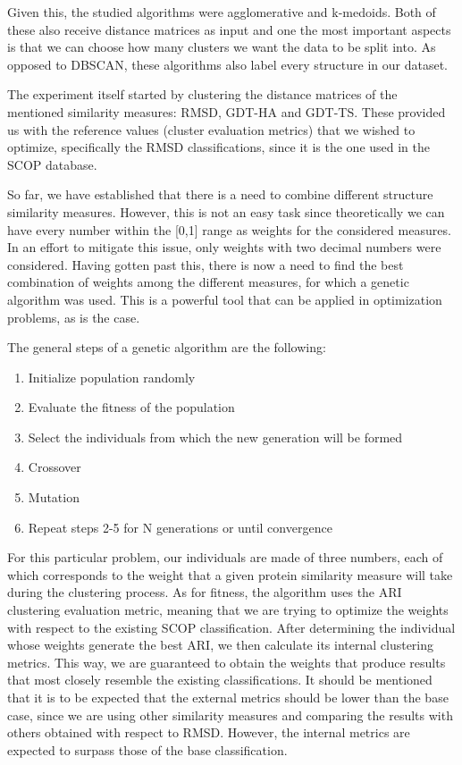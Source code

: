 Given this, the studied algorithms were agglomerative and k-medoids. Both of these also receive distance matrices as input and one the most important aspects is that we can choose how many clusters we want the data to be split into. As opposed to DBSCAN, these algorithms also label every structure in our dataset.

The experiment itself started by clustering the distance matrices of the mentioned similarity measures: RMSD, GDT-HA and GDT-TS. These provided us with the reference values (cluster evaluation metrics) that we wished to optimize, specifically the RMSD classifications, since it is the one used in the SCOP database. 

So far, we have established that there is a need to combine different structure similarity measures. However, this is not an easy task since theoretically we can have every number within the [0,1] range as weights for the considered measures. In an effort to mitigate this issue, only weights with two decimal numbers were considered. Having gotten past this, there is now a need to find the best combination of weights among the different measures, for which a genetic algorithm was used. This is a powerful tool that can be applied in optimization problems, as is the case.

The general steps of a genetic algorithm are the following:
\begin{enumerate}
	\item Initialize population randomly
	\item Evaluate the fitness of the population
	\item Select the individuals from which the new generation will be formed
	\item Crossover
	\item Mutation
	\item Repeat steps 2-5 for N generations or until convergence
\end{enumerate}

For this particular problem, our individuals are made of three numbers, each of which corresponds to the weight that a given protein similarity measure will take during the clustering process. As for fitness, the algorithm uses the ARI clustering evaluation metric, meaning that we are trying to optimize the weights with respect to the existing SCOP classification. After determining the individual whose weights generate the best ARI, we then calculate its internal clustering metrics. This way, we are guaranteed to obtain the weights that produce results that most closely resemble the existing classifications. It should be mentioned that it is to be expected that the external metrics should be lower than the base case, since we are using other similarity measures and comparing the results with others obtained with respect to RMSD. However, the internal metrics are expected to surpass those of the base classification.

